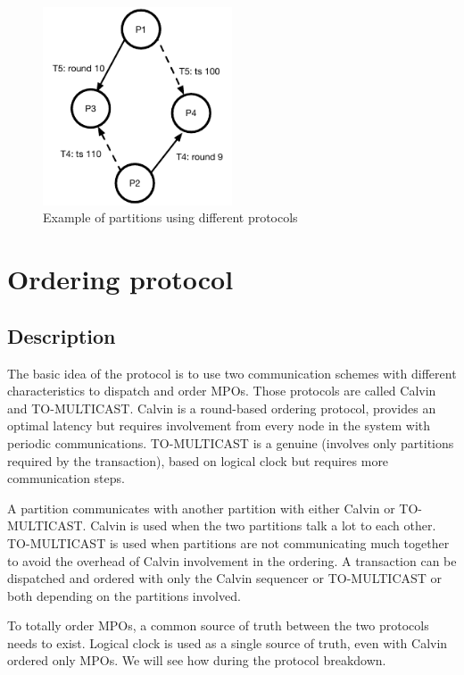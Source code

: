 \documentclass[a4paper, 10pt]{article}
\begin{document}
\begin{figure}
    \centering
    \includegraphics[width=0.5\textwidth]{assets/inconsistency}
    \caption{Example of partitions using different protocols}
    \label{fig:inconsistency}
\end{figure}


\section{Ordering protocol}

\subsection{Description}\label{sec:protocol}

The basic idea of the protocol is to use two communication schemes with different characteristics to dispatch and order
MPOs. Those protocols are called Calvin and TO-MULTICAST. Calvin is a round-based ordering protocol, provides an optimal
latency but requires involvement from every node in the system with periodic communications. TO-MULTICAST is a genuine (involves only
partitions required by the transaction), based on logical clock but requires more communication steps.

A partition communicates with another partition with either Calvin or TO-MULTICAST. Calvin is used when
the two partitions talk a lot to each other. TO-MULTICAST is used when partitions are not communicating much together
to avoid the overhead of Calvin involvement in the ordering. A transaction can be dispatched and ordered with only the Calvin sequencer or
TO-MULTICAST or both depending on the partitions involved.

To totally order MPOs, a common source of truth between the two protocols needs to exist. Logical clock
is used as a single source of truth, even with Calvin ordered only MPOs. We will see how during the protocol breakdown.
\end{document}
